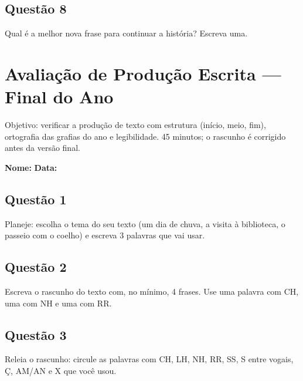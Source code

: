 \subsection*{Questão 8}
Qual é a melhor nova frase para continuar a história? Escreva uma.

\begin{center}
  \underline{\hspace{12cm}}
\end{center}

\clearpage

\section{Avaliação de Produção Escrita — Final do Ano}

\begin{avaliacao}
Objetivo: verificar a produção de texto com estrutura (início, meio, fim), ortografia das grafias do ano e legibilidade. 45 minutos; o rascunho é corrigido antes da versão final.
\end{avaliacao}

\noindent\textbf{Nome:} \underline{\hspace{4cm}} \quad \textbf{Data:} \underline{\hspace{2cm}}

\subsection*{Questão 1}
Planeje: escolha o tema do seu texto (um dia de chuva, a visita à biblioteca, o passeio com o coelho) e escreva 3 palavras que vai usar.

\begin{center}
  \underline{\hspace{12cm}}
\end{center}

\subsection*{Questão 2}
Escreva o rascunho do texto com, no mínimo, 4 frases. Use uma palavra com CH, uma com NH e uma com RR.

\begin{center}
  \underline{\hspace{12cm}}
\end{center}

\subsection*{Questão 3}
Releia o rascunho: circule as palavras com CH, LH, NH, RR, SS, S entre vogais, Ç, AM/AN e X que você usou.


